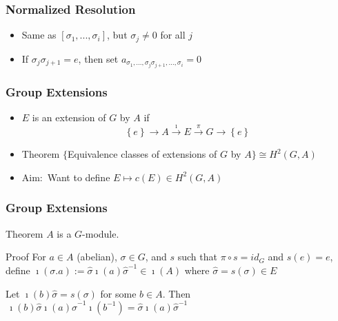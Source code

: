 \documentclass[10pt,xcolor=table,dvipsnames]{beamer}
\newenvironment{stepitemize}{\begin{itemize}[<+->]}{\end{itemize} }
\begin{document}
\begin{frame}
\frametitle{Normalized Resolution}
\begin{itemize}
\item Same as $\left[ \sigma _{1},...,\sigma _{i}\right] $, but $\sigma _{j}\not=0$
for all $j$

\item If $\sigma _{j}\sigma _{j+1}=e$, then set $a_{\sigma _{1},...,\sigma
_{j}\sigma _{j+1},...,\sigma _{i}}=0$
\end{itemize}
\end{frame}

\begin{frame}
\frametitle{Group Extensions}
\begin{stepitemize}
\item $E$ is an extension of $G$ by $A$ if
\begin{equation*}
\left\{ e\right\} \longrightarrow A\overset{\imath }{\longrightarrow }E%
\overset{\pi }{\longrightarrow }G\longrightarrow \left\{ e\right\}
\end{equation*}

\item[] \begin{block}{Theorem}%
$\{$Equivalence classes of extensions of $G$ by $A\}\cong H^{2}\left(
G,A\right) $\end{block}

\item Aim:\ Want to define $E\mapsto c\left( E\right) \in H^{2}\left( G,A\right) $

\end{stepitemize}
\end{frame}

\begin{frame}
\frametitle{Group Extensions}
\begin{block}{Theorem}%
$A$ is a $G$-module.
\end{block}

\begin{block}{Proof}%
\textcolor{stupid}{For $a\in A$ (abelian), $\sigma \in G$, and $s$ such that $\pi \circ s=id_{G}
$ and $s\left( e\right) =e$, define $\imath \left( \sigma .a\right) :=%
\widehat{\sigma }\imath \left( a\right) \widehat{\sigma }^{-1}\in \imath
\left( A\right) $ where $\widehat{\sigma }=s\left( \sigma \right) \in E$}

\textcolor{stupid}{Let $\imath \left( b\right) \widehat{\sigma }=s\left( \sigma \right) $ for
some $b\in A$. Then $\,\imath \left( b\right) \widehat{\sigma }\imath \left(
a\right) \widehat{\sigma }^{-1}\imath \left( b^{-1}\right) =\widehat{\sigma }%
\imath \left( a\right) \widehat{\sigma }^{-1}$}
\end{block}

\end{frame}
\end{document}
